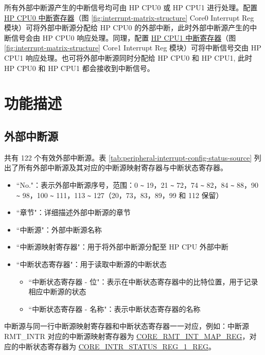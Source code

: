 \documentclass[main\_\_CN.tex]{subfiles}
\begin{document}
所有外部中断源产生的中断信号均可由 HP CPU0 或 HP CPU1 进行处理。配置 \hyperref[sec: cpu0-intmtrx-reg]{HP CPU0 中断寄存器}（图 \ref{fig:interrupt-matrix-structure} Core0 Interrupt Reg 模块）可将外部中断源分配给 HP CPU0 的外部中断，此时外部中断源产生的中断信号会由 HP CPU0 响应处理。同理，配置 \hyperref[sec: cpu1-intmtrx-reg]{HP CPU1 中断寄存器}（图 \ref{fig:interrupt-matrix-structure} Core1 Interrupt Reg 模块）可将中断信号交由 HP CPU1 响应处理。也可将外部中断源同时分配给 HP CPU0 和 HP CPU1, 此时 HP CPU0 和 HP CPU1 都会接收到中断信号。


\section{功能描述}

\subsection{外部中断源}

\chipname{} 共有 122 个有效外部中断源。表 \ref{tab:peripheral-interrupt-config-status-source} 列出了所有外部中断源及其对应的中断源映射寄存器与中断状态寄存器。


\begin{itemize}
    \item ``No."：表示外部中断源序号，范围：0 \verb+~+ 19，21 \verb+~+ 72，74 \verb+~+ 82，84 \verb+~+ 88，90 \verb+~+ 98，100 \verb+~+ 111，113 \verb+~+ 127（20，73，83，89，99 和 112 保留）
    \item ``章节"：详细描述外部中断源的章节
    \item ``中断源"：外部中断源名称
    \item ``中断源映射寄存器"：用于将外部中断源分配至 HP CPU 外部中断
    \item ``中断状态寄存器"：用于读取中断源的中断状态
    \begin{itemize}
        \item ``中断状态寄存器 - 位"：表示在中断状态寄存器中的比特位置，用于记录相应中断源的状态
        \item ``中断状态寄存器 - 名称"：表示中断状态寄存器的名称
    \end{itemize}
\end{itemize}

中断源与同一行中断源映射寄存器和中断状态寄存器一一对应，例如：中断源 RMT\_INTR 对应的中断源映射寄存器为 \hyperref[regdesc:CORE0RMTINTMAPREG]{CORE\_RMT\_INT\_MAP\_REG}，对应的中断状态寄存器为 \hyperref[regdesc:CORE0INTRSTATUSREG1REG]{CORE\_INTR\_STATUS\_REG\_1\_REG}。
\end{document}
